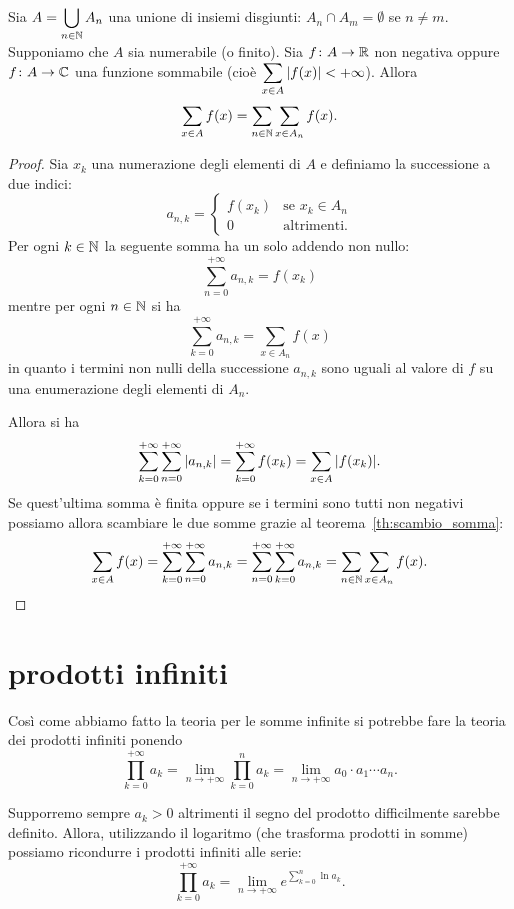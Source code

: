 \begin{theorem}
  Sia $A = \displaystyle\bigcup_{n\in {\mathbb N}} A_n$ una unione di insiemi 
  disgiunti: $A_n\cap A_m=\emptyset$ se $n\neq m$.
  Supponiamo che $A$ sia numerabile (o finito).
  Sia $f\colon A \to {\mathbb R}$ non negativa oppure $f\colon A \to {\mathbb C}$ 
  una funzione sommabile (cioè $\displaystyle\sum_{x\in A}{\left|f(x)\right|}< +\infty$).
  Allora 
  \[
    \sum_{x\in A}f(x) = \sum_{n\in {\mathbb N}} \sum_{x\in A_n} f(x).  
  \]
\end{theorem}
%
\begin{proof}
Sia $x_k$ una numerazione degli elementi di $A$ e definiamo 
la successione a due indici:
\[
  a_{n,k} = \begin{cases}
    f(x_k) & \text{se $x_k\in A_n$}\\
    0 & \text{altrimenti.}
  \end{cases}  
\]
Per ogni $k\in {\mathbb N}$ la seguente somma 
ha un solo addendo non nullo:
\[
 \sum_{n=0}^{+\infty}  a_{n,k} = f(x_k)
\]
mentre per ogni $n\in {\mathbb N}$ si ha 
\[
 \sum_{k=0}^{+\infty} a_{n,k} = \sum_{x\in A_n} f(x)  
\]
in quanto i termini non nulli della successione 
$a_{n,k}$ sono uguali al valore di $f$ su una enumerazione 
degli elementi di $A_n$.

Allora si ha
\[
 \sum_{k=0}^{+\infty}\sum_{n=0}^{+\infty} {\left|a_{n,k}\right|}
 = \sum_{k=0}^{+\infty} {f(x_k)} = \sum_{x\in A} {\left|f(x_k)\right|}.
\]
Se quest'ultima somma è finita oppure se i termini sono tutti non negativi
possiamo allora scambiare le due somme grazie al teorema~\ref{th:scambio_somma}:
\[
  \sum_{x\in A} f(x) 
  = \sum_{k=0}^{+\infty} \sum_{n=0}^{+\infty} a_{n,k}
  = \sum_{n=0}^{+\infty} \sum_{k=0}^{+\infty} a_{n,k}
  = \sum_{n\in {\mathbb N}} \sum_{x\in A_n}f(x).  
\]
\end{proof}

\section{prodotti infiniti}

Così come abbiamo fatto la teoria per le somme infinite si potrebbe fare
la teoria dei prodotti infiniti ponendo
\[
  \prod_{k=0}^{+\infty} a_k = \lim_{n\to +\infty} \prod_{k=0}^n a_k
  = \lim_{n\to +\infty} a_0 \cdot a_1 \cdots a_n.
\]

Supporremo sempre $a_k>0$ altrimenti il segno del prodotto difficilmente
sarebbe definito.
Allora, utilizzando il logaritmo (che trasforma prodotti in somme) possiamo
ricondurre i prodotti infiniti
alle serie:
\[
  \prod_{k=0}^{+\infty} a_k = \lim_{n\to +\infty} e^{\sum_{k=0}^n \ln a_k}.
\]

